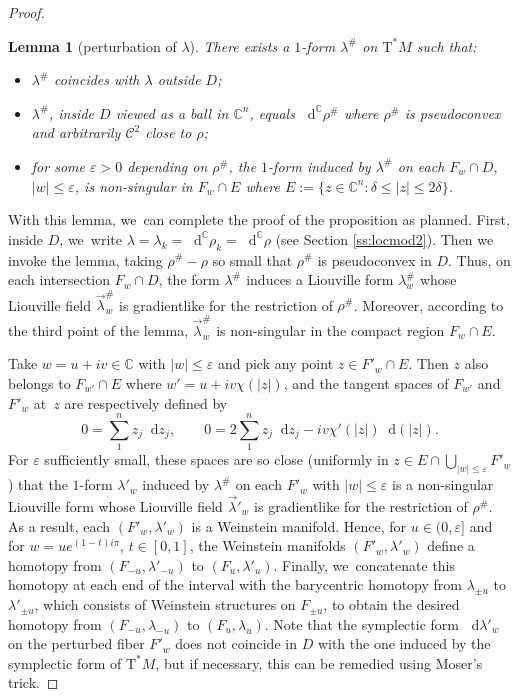 \documentclass[JEP,XML,SOM,Unicode]{cedram}
\newcommand{\C}{{\mathbb C}}
\newcommand{\cC}{{\mathcal{C}}}
\newcommand{\tu}[1]{\textup{#1}}
\newcommand{\sT}{\mathrm{T}^\ast}
\renewcommand{\d}{\mathop{}\!\mathrm d}
\newcommand{\dc}{\d^{\scriptscriptstyle{\C}}}
\newcommand{\dlambda}{\d\lambda}
\newcommand{\dz}{\d z}
\newcommand{\de}{\mathrel{:=}}
\newcommand{\with}{\mathrel{:}}
\let\eps\varepsilon
\theoremstyle{plain}
\newtheorem{lemma}[theorem]{Lemma}
\theoremstyle{definition}
\begin{document}
\begin{proof}
\begin{lemma}[perturbation of $\lambda$] \label{l:sharp}
There exists a $1$-form $\lambda^\#$ on $\sT M$ such that\tu:
\begin{itemize}
\item
$\lambda^\#$ coincides with $\lambda$ outside $D$;
\item
$\lambda^\#$, inside $D$ viewed as a ball in $\C^n$, equals $\dc\rho^\#$ where
$\rho^\#$ is pseudoconvex and arbitrarily $\cC^2$ close to $\rho$\tu;
\item
for some $\eps>0$ depending on $\rho^\#$, the $1$-form induced by $\lambda^\#$
on each $F_w \cap D$, $|w| \le \eps$, is non-singular in $F_w \cap E$ where $E
\de \{z \in \C^n \with \delta \le |z| \le 2\delta\}$.
\end{itemize}
\end{lemma}

With this lemma, we~can complete the proof of the proposition as planned. First,
inside $D$, we~write $\lambda = \lambda_k = \dc\rho_k = \dc\rho$ (see Section
\ref{ss:locmod2}). Then we invoke the lemma, taking $\rho^\# - \rho$ so small
that $\rho^\#$ is pseudoconvex in $D$. Thus, on each intersection $F_w \cap D$,
the form $\lambda^\#$ induces a Liouville form $\lambda^\#_w$ whose Liouville
field $\vec\lambda^\#_w$ is gradientlike for the restriction of $\rho^\#$.
Moreover, according to the third point of the lemma, $\vec\lambda^\#_w$ is
non-singular in the compact region $F_w \cap E$.

Take $w = u+iv \in \C$ with $|w| \le \eps$ and pick any point $z \in F'_w \cap
E$. Then $z$ also belongs to $F_{w'} \cap E$ where $w' = u + iv \chi(|z|)$, and
the tangent spaces of $F_{w'}$ and $F'_w$ at~$z$ are respectively defined by
\[
 0 = \sum_1^n z_j \dz_j, \qquad
 0 = 2 \sum_1^n z_j \dz_j - iv \chi'(|z|) \d(|z|).
\]
For $\eps$ sufficiently small, these spaces are so close (uniformly in $z \in E
\cap \bigcup_{|w| \le \eps} F'_w$) that the $1$-form $\lambda'_w$ induced by
$\lambda^\#$ on each $F'_w$ with $|w| \le \eps$ is a non-singular Liouville
form whose Liouville field $\vec\lambda'_w$ is gradientlike for the restriction
of $\rho^\#$. As a result, each $(F'_w, \lambda'_w)$ is a Weinstein manifold.
Hence, for $u \in (0,\eps]$ and for $w = u e^{(1-t)i\pi}$, $t \in [0,1]$, the
Weinstein manifolds $(F'_w, \lambda'_w)$ define a homotopy from $(F_{-u},
\lambda'_{-u})$ to $(F_u, \lambda'_u)$. Finally, we~concatenate this homotopy at
each end of the interval with the barycentric homotopy from $\lambda_{\pm u}$ to
$\lambda'_{\pm u}$, which consists of Weinstein structures on $F_{\pm u}$, to
obtain the desired homotopy from $(F_{-u}, \lambda_{-u})$ to $(F_u, \lambda_u)$.
Note that the symplectic form $\dlambda'_w$ on the perturbed fiber $F'_w$ does
not coincide in $D$ with the one induced by the symplectic form of $\sT M$, but
if necessary, this can be remedied using Moser's trick.
\end{proof}
\end{document}
